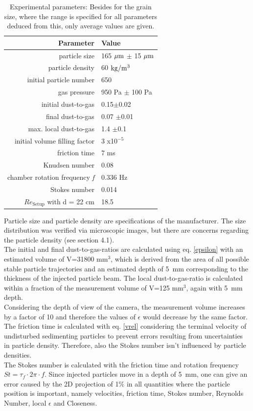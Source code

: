 \begin{table}
\centering
\caption{Experimental parameters: Besides for the grain size, where the range is specified for all parameters deduced from this, only average values are given.}
\begin{tabular}{r|l}
Parameter&Value\\
\hline
particle size&165 $\rm \mu m$  $\pm$ 15 $\rm \mu m$\\
particle density&60 $\rm kg / m^3$ \\
initial particle number& 650\\
gas pressure&950 Pa $\pm$ 100 Pa\\
initial dust-to-gas& 0.15$\pm$0.02 \\
final dust-to-gas& 0.07 $\pm$0.01\\
max. local dust-to-gas & 1.4 $\pm$0.1\\ 
initial volume filling factor& 3 x10$^{-5}$\\
friction time&7 ms\\
Knudsen number&0.08\\
{chamber} rotation frequency \textit{f} & 0.336 Hz\\
Stokes number&0.014\\
$Re_\mathrm{Setup}$ with d = 22 cm & 18.5
\label{para}
\end{tabular}
\end{table}

{
Particle size and particle density are specifications of the manufacturer. The size distribution was verified via microscopic images, but there are concerns regarding the particle density (see section 4.1).\\  
The initial and final dust-to-gas-ratios are calculated using eq. \ref{epsilon} with an estimated volume of V=31800 mm$^3$, which is derived from the area of all possible stable particle trajectories and an estimated depth of 5~mm corresponding to the thickness of the injected particle beam. The local dust-to-gas-ratio is calculated within a fraction of the measurement volume of V=125 mm$^3$, again with 5~mm depth.\\
Considering the depth of view of the camera, the measurement volume increases by a factor of 10 and therefore the values of $\epsilon$ would decrease by the same factor.\\
The friction time is calculated {with eq. \ref{vrel}} {considering} the terminal velocity of undisturbed sedimenting particles to prevent errors resulting from uncertainties in particle density. Therefore, also the Stokes number isn't influenced by {particle densities.} \\
{The Stokes number is calculated with the friction time and rotation frequency $St= \tau_f \cdot 2 \pi \cdot f$.}
Since {injected} particles move in {a} depth of 5~mm, one can give an error {caused by the 2D projection} of 1$\%$ in all quantities where the particle position is important, namely velocities, friction time, Stokes number, Reynolds Number, local $\epsilon$ and Closeness.}




